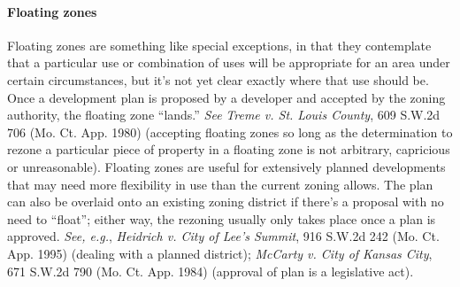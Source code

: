 \paragraph{Floating zones} Floating zones are something like special exceptions,
in that they contemplate that a particular use or combination of uses will be
appropriate for an area under certain circumstances, but it's not yet clear
exactly where that use should be. Once a development plan is proposed by a
developer and accepted by the zoning authority, the floating zone ``lands.''
\textit{See} \emph{Treme v. St. Louis County}, 609 S.W.2d 706 (Mo. Ct. App.
1980) (accepting floating zones so long as the determination to rezone a
particular piece of property in a floating zone is not arbitrary, capricious or
unreasonable). Floating zones are useful for extensively planned developments
that may need more flexibility in use than the current zoning allows. The plan
can also be overlaid onto an existing zoning district if there's a proposal with
no need to ``float''; either way, the rezoning usually only takes place once a
plan is approved. \emph{See, e.g.}, \emph{Heidrich v. City of Lee's Summit}, 916
S.W.2d 242 (Mo. Ct. App. 1995) (dealing with a planned district); \emph{McCarty
v. City of Kansas City}, 671 S.W.2d 790 (Mo. Ct. App. 1984) (approval of plan is
a legislative act).

